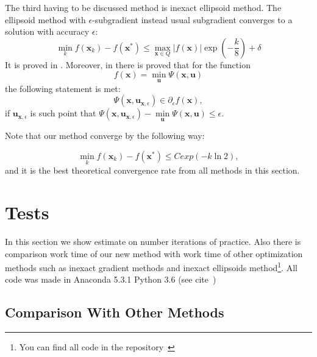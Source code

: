 \documentclass[12pt]{article}
\begin{document}
The third having to be discussed method is inexact ellipsoid method. The ellipsoid method with $\epsilon$-subgradient instead usual subgradient converges to a solution with accuracy $\epsilon$:
$$\min_k f(\textbf{x}_k) - f(\textbf{x}^*)\leq \max_{\textbf{x}\in Q}|f(\textbf{x})|\exp\left(-\frac{k}{8}\right)+\delta$$
It is proved in \cite{Ellipsoids}. Moreover, in \cite{Polyak} there is proved that for the function
$$f(\textbf{x}) = \min\limits_\textbf{u}\Psi(\textbf{x},\textbf{u})$$
the following statement is met:
$$\Psi(\textbf{x},\textbf{u}_{\textbf{x},\epsilon})\in\partial_\epsilon f(\textbf{x}),$$
if $\textbf{u}_{\textbf{x},\epsilon}$ is such point that $\Psi(\textbf{x},\textbf{u}_{\textbf{x},\epsilon}) - \min\limits_\textbf{u}\Psi(\textbf{x},\textbf{u})\leq\epsilon$.

Note that our method converge by the following way:

$$\min_k f(\textbf{x}_k) - f(\textbf{x}^*) \leq Cexp(-k\ln 2),$$
and it is the best theoretical convergence rate from all methods in this section.
\section{Tests}

In this section we show estimate on number iterations of practice. Also there is comparison work time of our new method with work time of other optimization methods such as inexact gradient methods and inexact ellipsoids method\footnote{You can find all code in the repository~\cite{my_git}}. All code was made in Anaconda 5.3.1 Python 3.6 (see cite~\cite{conda})


\subsection{Comparison With Other Methods}
\label{Comparison}
\end{document}
